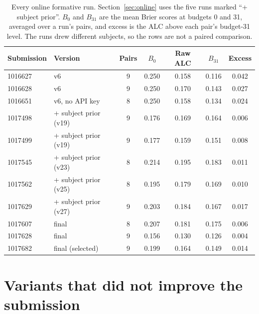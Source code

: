 \documentclass{article}
\begin{document}
\begin{table}[h]
\centering
\caption{Every online formative run. Section~\ref{sec:online} uses the five runs marked ``+ subject prior''. $B_0$ and $B_{31}$ are the mean Brier scores at budgets 0 and 31, averaged over a run's pairs, and excess is the ALC above each pair's budget-31 level. The runs drew different subjects, so the rows are not a paired comparison.}
\small
\begin{tabular}{llccccc}
\toprule
Submission & Version & Pairs & $B_0$ & Raw ALC & $B_{31}$ & Excess \\
\midrule
1016627 & v6 & 9 & 0.250 & 0.158 & 0.116 & 0.042 \\
1016628 & v6 & 9 & 0.250 & 0.170 & 0.143 & 0.027 \\
1016651 & v6, no API key & 8 & 0.250 & 0.158 & 0.134 & 0.024 \\
1017498 & + subject prior (v19) & 9 & 0.176 & 0.169 & 0.164 & 0.006 \\
1017499 & + subject prior (v19) & 9 & 0.177 & 0.159 & 0.151 & 0.008 \\
1017545 & + subject prior (v23) & 8 & 0.214 & 0.195 & 0.183 & 0.011 \\
1017562 & + subject prior (v25) & 8 & 0.195 & 0.179 & 0.169 & 0.010 \\
1017629 & + subject prior (v27) & 9 & 0.203 & 0.184 & 0.167 & 0.017 \\
1017607 & final & 8 & 0.207 & 0.181 & 0.175 & 0.006 \\
1017628 & final & 9 & 0.156 & 0.130 & 0.126 & 0.004 \\
1017682 & final (selected) & 9 & 0.199 & 0.164 & 0.149 & 0.014 \\
\bottomrule
\end{tabular}
\end{table}

\section{Variants that did not improve the submission}
\label{app:neg}
\end{document}
